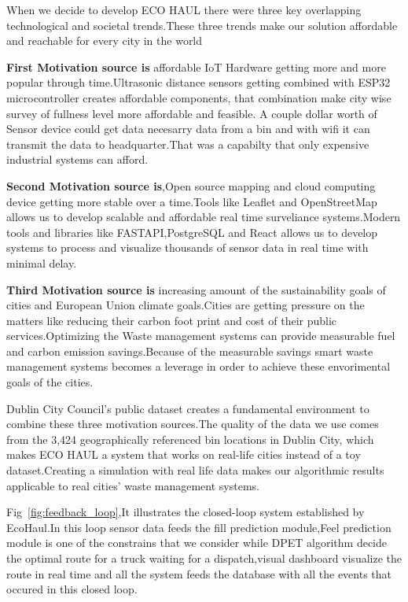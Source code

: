 \documentclass[12pt,a4paper]{report}
\begin{document}
\indent When we decide to develop ECO HAUL there were three key overlapping technological  and societal  trends.These three trends make our solution affordable and reachable for every city in the world

\indent \textbf{First Motivation source is} affordable IoT Hardware getting more and more popular through time.Ultrasonic distance sensors getting combined with ESP32 microcontroller creates affordable components, that combination make city wise survey of fullness level more affordable and feasible. A couple dollar worth of Sensor device could get data necesarry data from a bin and with wifi it can transmit the data to headquarter.That was a capabilty that only expensive industrial systems can afford.

\indent \textbf{Second Motivation source is},Open source mapping and cloud computing device getting  more stable over a time.Tools like Leaflet and OpenStreetMap  allows us to develop scalable and affordable real time surveliance systems.Modern tools and libraries like FASTAPI,PostgreSQL and React allows us to develop systems to  process and visualize thousands of sensor data in real time with minimal delay.

\indent \textbf{Third Motivation source is} increasing amount of the sustainability goals of cities and European Union  climate goals.Cities are getting pressure on the matters like reducing their carbon foot print and cost of their public services.Optimizing the Waste management systems  can provide measurable  fuel and carbon emission savings.Because of the measurable savings smart waste management systems becomes a leverage in order to achieve these envorimental goals of the cities.

\indent Dublin City Council's public dataset creates a fundamental environment to combine these three motivation sources.The quality of the data we use comes from the 3,424 geographically referenced bin locations in Dublin City, which makes ECO HAUL a system that works on real-life cities instead of a toy dataset.Creating a simulation with real life data makes our algorithmic results applicable to real cities' waste management systems.

\indent  Fig~\ref{fig:feedback_loop},It illustrates the closed-loop system established by EcoHaul.In this loop sensor data feeds the fill prediction module,Feel prediction module is one of the constrains that we consider while DPET algorithm decide the optimal route for a truck waiting for a dispatch,visual dashboard visualize the route in real time and all the system feeds the database with all the events that occured in this closed loop.
\end{document}

